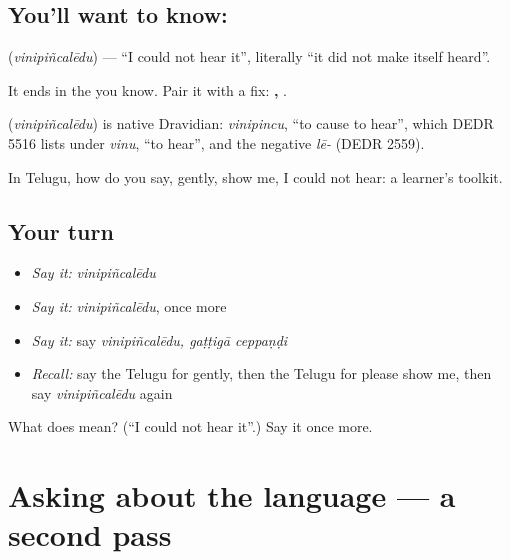 \subsection*{You'll want to know: }
\textbf{} (\emph{vinipiñcalēdu}) — \textquotedblleft{}I could not hear it\textquotedblright{}, literally \textquotedblleft{}it did not make itself heard\textquotedblright{}.

It ends in the \textbf{} you know. Pair it with a fix: \textbf{,  }.

\begin{cousinweb}
\textbf{} (\emph{vinipiñcalēdu}) is native Dravidian: \emph{vinipincu}, \textquotedblleft{}to cause to hear\textquotedblright{}, which DEDR 5516 lists under \emph{vinu}, \textquotedblleft{}to hear\textquotedblright{}, and the negative \emph{lē-} (DEDR 2559).
\end{cousinweb}

\begin{grammarlens}[title={What you've built}]
In Telugu, how do you say, gently, show me, I could not hear: a learner's toolkit.
\end{grammarlens}

\subsection*{Your turn}
\begin{itemize}
\raggedright
  \item \emph{Say it:} \emph{vinipiñcalēdu}
  \item \emph{Say it:} \emph{vinipiñcalēdu}, once more
  \item \emph{Say it:} say \emph{vinipiñcalēdu, gaṭṭigā ceppaṇḍi}
  \item \emph{Recall:} say the Telugu for gently, then the Telugu for please show me, then say \emph{vinipiñcalēdu} again
\end{itemize}

\begin{tcolorbox}[breakable,colback=teal!4,colframe=teal!35!black,title={Before you move on}]
What does  mean? (\textquotedblleft{}I could not hear it\textquotedblright{}.) Say it once more.
\end{tcolorbox}
\section[(dialogue)]{Asking about the language — a second pass}

